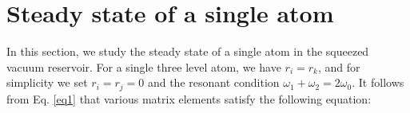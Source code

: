 \documentclass[aps,showpacs,twocolumn,twoside,groupedaddress]{revtex4}
\begin{document}
\section{Steady state of a single atom}
In this section, we study the steady state of a single atom in the squeezed vacuum reservoir. For a single three level atom, we have $r_i=r_k$, and for simplicity we set $r_i=r_j=0$ and the resonant condition $\omega_1+\omega_2=2\omega_0$. It follows from Eq. \eqref{eq1} that various matrix elements satisfy the following equation:
\end{document}
